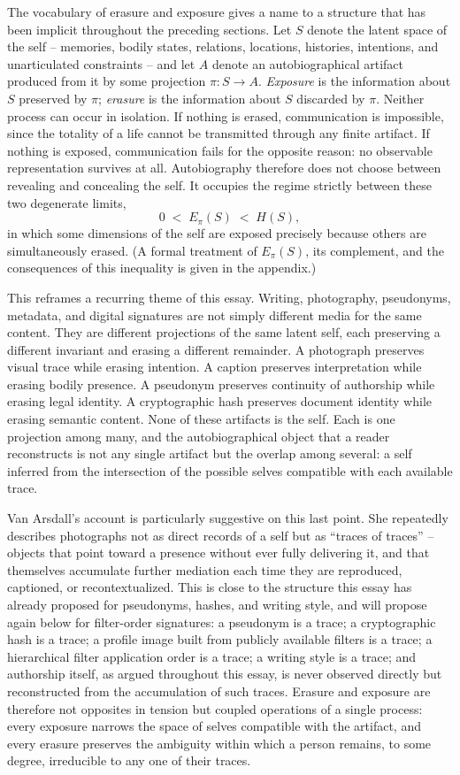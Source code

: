 \documentclass[11pt]{article}
\theoremstyle{plain}
\begin{document}
The vocabulary of erasure and exposure gives a name to a structure that has been implicit throughout the preceding sections. Let $S$ denote the latent space of the self -- memories, bodily states, relations, locations, histories, intentions, and unarticulated constraints -- and let $A$ denote an autobiographical artifact produced from it by some projection $\pi : S \to A$. \emph{Exposure} is the information about $S$ preserved by $\pi$; \emph{erasure} is the information about $S$ discarded by $\pi$. Neither process can occur in isolation. If nothing is erased, communication is impossible, since the totality of a life cannot be transmitted through any finite artifact. If nothing is exposed, communication fails for the opposite reason: no observable representation survives at all. Autobiography therefore does not choose between revealing and concealing the self. It occupies the regime strictly between these two degenerate limits,
\[
0 \;<\; E_\pi(S) \;<\; H(S),
\]
in which some dimensions of the self are exposed precisely because others are simultaneously erased. (A formal treatment of $E_\pi(S)$, its complement, and the consequences of this inequality is given in the appendix.)

This reframes a recurring theme of this essay. Writing, photography, pseudonyms, metadata, and digital signatures are not simply different media for the same content. They are different projections of the same latent self, each preserving a different invariant and erasing a different remainder. A photograph preserves visual trace while erasing intention. A caption preserves interpretation while erasing bodily presence. A pseudonym preserves continuity of authorship while erasing legal identity. A cryptographic hash preserves document identity while erasing semantic content. None of these artifacts is the self. Each is one projection among many, and the autobiographical object that a reader reconstructs is not any single artifact but the overlap among several: a self inferred from the intersection of the possible selves compatible with each available trace.

Van Arsdall's account is particularly suggestive on this last point. She repeatedly describes photographs not as direct records of a self but as ``traces of traces'' -- objects that point toward a presence without ever fully delivering it, and that themselves accumulate further mediation each time they are reproduced, captioned, or recontextualized. This is close to the structure this essay has already proposed for pseudonyms, hashes, and writing style, and will propose again below for filter-order signatures: a pseudonym is a trace; a cryptographic hash is a trace; a profile image built from publicly available filters is a trace; a hierarchical filter application order is a trace; a writing style is a trace; and authorship itself, as argued throughout this essay, is never observed directly but reconstructed from the accumulation of such traces. Erasure and exposure are therefore not opposites in tension but coupled operations of a single process: every exposure narrows the space of selves compatible with the artifact, and every erasure preserves the ambiguity within which a person remains, to some degree, irreducible to any one of their traces.
\end{document}
